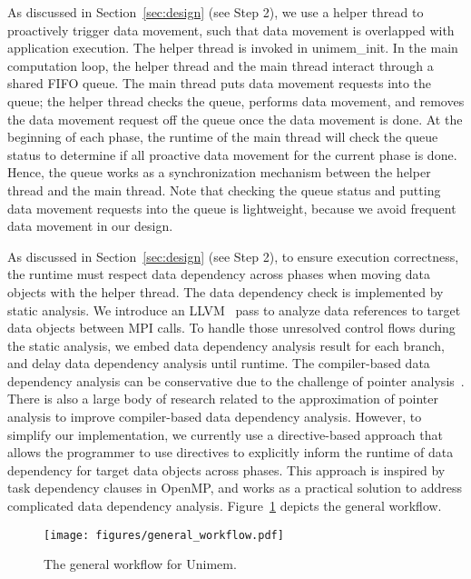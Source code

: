 As discussed in Section~\ref{sec:design} (see Step 2), we use a helper thread to proactively trigger data movement, such that data movement 
is overlapped with  application execution. The helper thread is invoked in {\selectfont unimem\_init}. In the main computation loop, the helper thread and the main thread interact through a shared FIFO queue. The main thread puts data movement requests into the queue; the helper thread checks the queue, performs data movement, and removes the data movement request off the queue once the data movement is done. 
At the beginning of each phase, the runtime of the main thread will check the queue status to determine if all proactive data movement for the current phase is done. Hence, the queue works as a synchronization mechanism between the helper thread and the main thread. 
Note that checking the queue status and putting data movement requests into the queue is lightweight, because we avoid frequent data movement in our design. 

As discussed in Section~\ref{sec:design} (see Step 2), to ensure execution correctness, the runtime must respect data dependency across phases when moving data objects with the helper thread.
The data dependency check is implemented by static analysis.
We introduce an LLVM~\cite{Lattner:Mthesis} pass to analyze data references to target data objects 
between MPI calls. 
To handle those unresolved control flows during the static analysis, we
embed data dependency analysis result for each branch,
and delay data dependency analysis until runtime.
The compiler-based data dependency analysis can be conservative
due to the challenge of pointer analysis~\cite{popl03:chakaravarthy}. 
There is also a large body of research related to the
approximation of pointer analysis to improve compiler-based data dependency analysis. However, to simplify our implementation, we currently use a directive-based
approach that allows the programmer to use directives to explicitly inform
the runtime of data dependency for target data objects across phases.
This approach is inspired by task dependency clauses in OpenMP, and works
as a practical solution to address complicated data dependency analysis.
Figure~\ref{fig:general_workflow} depicts the general workflow. %
\vspace{-5pt}
\begin{figure}
   \centering
   \texttt{[image: figures/general\_workflow.pdf]}
   \vspace{-10pt}
   \caption{The general workflow for Unimem.}
   \label{fig:general_workflow}
   \vspace{-20pt}
   	\vspace*{5pt}
\end{figure}


